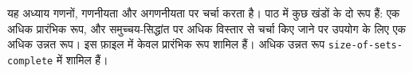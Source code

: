 \documentclass[../../../include/open-logic-chapter]{subfiles}
\begin{document}

\begin{editorial}
यह अध्याय गणनों, गणनीयता और अगणनीयता पर चर्चा करता है। पाठ में कुछ खंडों के
दो रूप हैं: एक अधिक प्रारंभिक रूप, और समुच्चय-सिद्धांत पर अधिक विस्तार से
चर्चा किए जाने पर उपयोग के लिए एक अधिक उन्नत रूप। इस फ़ाइल में केवल प्रारंभिक
रूप शामिल हैं। अधिक उन्नत रूप \verb|size-of-sets-complete| में शामिल हैं।
\end{editorial}











\OLEndChapterHook
\end{document}
